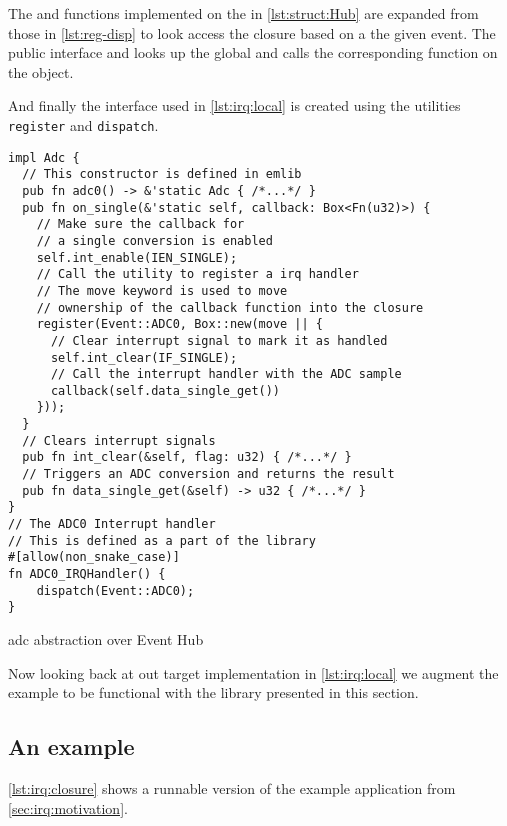 The  and  functions implemented on the   in \autoref{lst:struct:Hub} are expanded from those in \autoref{lst:reg-disp} to look access the closure based on a the given event.
The public interface  and  looks up the global  and calls the corresponding function on the  object.

And finally the interface used in \autoref{lst:irq:local} is created using the utilities \texttt{register} and \texttt{dispatch}.
\begin{listing}[H]
  \begin{verbatim}
impl Adc {
  // This constructor is defined in emlib
  pub fn adc0() -> &'static Adc { /*...*/ }
  pub fn on_single(&'static self, callback: Box<Fn(u32)>) {
    // Make sure the callback for
    // a single conversion is enabled
    self.int_enable(IEN_SINGLE);
    // Call the utility to register a irq handler
    // The move keyword is used to move
    // ownership of the callback function into the closure
    register(Event::ADC0, Box::new(move || {
      // Clear interrupt signal to mark it as handled
      self.int_clear(IF_SINGLE);
      // Call the interrupt handler with the ADC sample
      callback(self.data_single_get())
    }));
  }
  // Clears interrupt signals
  pub fn int_clear(&self, flag: u32) { /*...*/ }
  // Triggers an ADC conversion and returns the result
  pub fn data_single_get(&self) -> u32 { /*...*/ }
}
// The ADC0 Interrupt handler
// This is defined as a part of the library
#[allow(non_snake_case)]
fn ADC0_IRQHandler() {
    dispatch(Event::ADC0);
}
  \end{verbatim}
  \caption{\gls{adc} abstraction over Event Hub}
  \label{lst:adc-abstraction}
\end{listing}

Now looking back at out target implementation in \autoref{lst:irq:local} we augment the example to be functional with the library presented in this section.

\subsection{An example}

\autoref{lst:irq:closure} shows a runnable version of the example application from \autoref{sec:irq:motivation}.

